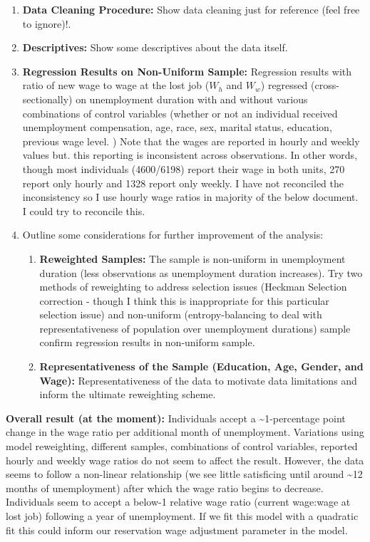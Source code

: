 \documentclass[
]{article}
\providecommand{\tightlist}{%
  \setlength{\itemsep}{0pt}\setlength{\parskip}{0pt}}
\begin{document}
\begin{enumerate}
\def\labelenumi{\arabic{enumi}.}
\tightlist
\item
  \textbf{Data Cleaning Procedure:} Show data cleaning just for
  reference (feel free to ignore)!.
\item
  \textbf{Descriptives:} Show some descriptives about the data itself.
\item
  \textbf{Regression Results on Non-Uniform Sample:} Regression results
  with ratio of new wage to wage at the lost job (\(W_{h}\) and
  \(W_{w}\)) regressed (cross-sectionally) on unemployment duration with
  and without various combinations of control variables (whether or not
  an individual received unemployment compensation, age, race, sex,
  marital status, education, previous wage level. ) Note that the wages
  are reported in hourly and weekly values but. this reporting is
  inconsistent across observations. In other words, though most
  individuals (4600/6198) report their wage in both units, 270 report
  only hourly and 1328 report only weekly. I have not reconciled the
  inconsistency so I use hourly wage ratios in majority of the below
  document. I could try to reconcile this.
\item
  Outline some considerations for further improvement of the analysis:

  \begin{enumerate}
  \def\labelenumii{\arabic{enumii}.}
  \tightlist
  \item
    \textbf{Reweighted Samples:} The sample is non-uniform in
    unemployment duration (less observations as unemployment duration
    increases). Try two methods of reweighting to address selection
    issues (Heckman Selection correction - though I think this is
    inappropriate for this particular selection issue) and non-uniform
    (entropy-balancing to deal with representativeness of population
    over unemployment durations) sample confirm regression results in
    non-uniform sample.
  \item
    \textbf{Representativeness of the Sample (Education, Age, Gender,
    and Wage):} Representativeness of the data to motivate data
    limitations and inform the ultimate reweighting scheme.
  \end{enumerate}
\end{enumerate}

\textbf{Overall result (at the moment):} Individuals accept a
\textasciitilde1-percentage point change in the wage ratio per
additional month of unemployment. Variations using model reweighting,
different samples, combinations of control variables, reported hourly
and weekly wage ratios do not seem to affect the result. However, the
data seems to follow a non-linear relationship (we see little
satisficing until around \textasciitilde12 months of unemployment) after
which the wage ratio begins to decrease. Individuals seem to accept a
below-1 relative wage ratio (current wage:wage at lost job) following a
year of unemployment. If we fit this model with a quadratic fit this
could inform our reservation wage adjustment parameter in the model.
\end{document}
